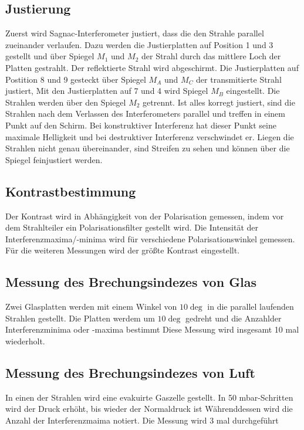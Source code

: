 \subsection{Justierung}%
Zuerst wird Sagnac-Interferometer justiert,
dass die den Strahle parallel zueinander verlaufen.
Dazu werden die Justierplatten auf Position 1 und 3 gestellt 
und über Spiegel $M_1$ und $M_2$ der Strahl durch das mittlere Loch der Platten gestrahlt.
Der reflektierte Strahl wird abgeschirmt.
Die Justierplatten auf Postition 8 und 9 gesteckt
über Spiegel $M_A$ und $M_C$ der transmitierte Strahl justiert,
Mit den Justierplatten auf 7 und 4 wird Spiegel $M_B$ eingestellt.
Die Strahlen werden über den Spiegel $M_2$ getrennt.
\noindent Ist alles korregt justiert,
sind die Strahlen nach dem Verlassen des Interferometers parallel und
treffen in einem Punkt auf den Schirm.
Bei konstruktiver Interferenz hat dieser Punkt seine maximale Helligkeit 
und bei destruktiver Interferenz verschwindet er.
Liegen die Strahlen nicht genau übereinander, sind Streifen zu sehen
und können über die Spiegel feinjustiert werden.

\subsection{Kontrastbestimmung}%
Der Kontrast wird in Abhängigkeit von der Polarisation gemessen,
indem vor dem Strahlteiler ein Polarisationsfilter gestellt wird.
Die Intensität der Interferenzmaxima/-minima wird für verschiedene Polarisationswinkel gemessen.
\newline \newline
\noindent Für die weiteren Messungen wird der größte Kontrast eingestellt.

\subsection{Messung des Brechungsindezes von Glas}%
Zwei Glasplatten werden mit einem Winkel von $10\deg$ 
in die parallel laufenden Strahlen gestellt.
Die Platten werdem um $10\deg$ gedreht und die Anzahlder Interferenzminima  oder -maxima bestimmt
Diese Messung wird insgesamt 10 mal wiederholt.

\subsection{Messung des Brechungsindezes von Luft}%
In einen der Strahlen wird eine evakuirte Gaszelle gestellt.
In 50 mbar-Schritten wird der Druck erhöht, bis wieder der Normaldruck ist
Währenddessen wird die Anzahl der Interferenzmaima notiert.
Die Messung wird 3 mal durchgeführt

